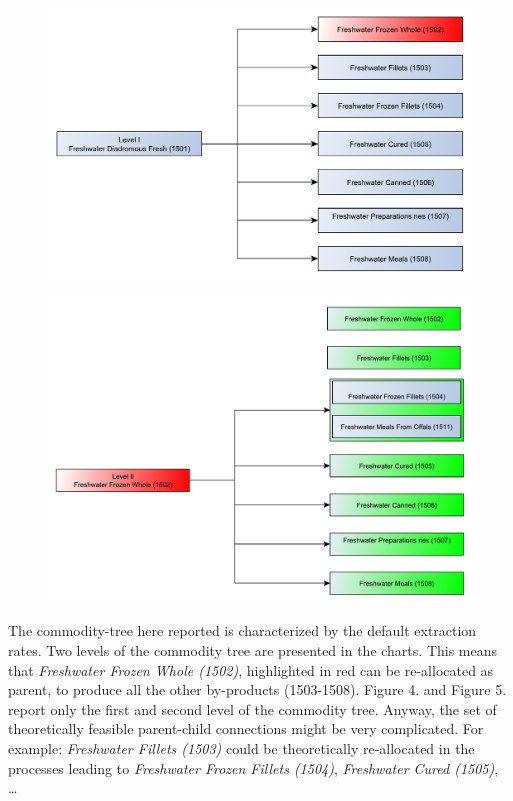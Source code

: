 \documentclass[nojss]{jss}
\begin{document}
\begin{figure}
\includegraphics{flow-charts/tree/tree1501.pdf}
\caption{}
\end{figure}


\begin{figure}
\includegraphics{flow-charts/tree/tree1502_level2.pdf}
\caption{}
\end{figure}


The commodity-tree here reported is characterized by the default extraction rates. Two levels of the commodity tree are presented in the charts. This means that \textit{Freshwater Frozen Whole (1502)}, highlighted in red can be re-allocated as parent, to produce all the other by-products (1503-1508). Figure 4. and Figure 5. report only the first and second level of the commodity tree. Anyway, the set of theoretically feasible parent-child connections might be very complicated. For example: \textit{Freshwater Fillets (1503)} could be theoretically re-allocated in the processes leading to \textit{Freshwater Frozen Fillets (1504)}, \textit{Freshwater Cured (1505)}, \dots
\end{document}
